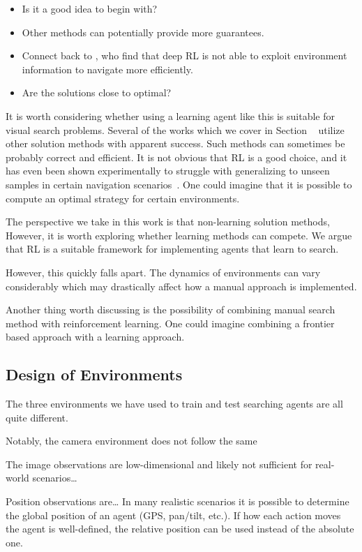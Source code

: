 \begin{itemize}
    \item Is it a good idea to begin with?
    \item Other methods can potentially provide more guarantees.
    \item Connect back to \cite{dhiman_critical_2019}, who find that deep RL is not able to exploit environment information to navigate more efficiently.
    \item Are the solutions close to optimal?
\end{itemize}

It is worth considering whether using a learning agent like this is suitable for visual search problems.
Several of the works which we cover in Section ~\label{sec:relatedwork} utilize other solution methods with apparent success.
Such methods can sometimes be probably correct and efficient.
It is not obvious that RL is a good choice, and it has even been shown experimentally to struggle with generalizing to unseen samples in certain navigation scenarios~\cite{dhiman_critical_2019}.
One could imagine that it is possible to compute an optimal strategy for certain environments.

The perspective we take in this work is that non-learning solution methods,
However, it is worth exploring whether learning methods can compete.
We argue that RL is a suitable framework for implementing agents that learn to search.

However, this quickly falls apart.
The dynamics of environments can vary considerably which may drastically affect how a manual approach is implemented.

Another thing worth discussing is the possibility of combining manual search method with reinforcement learning.
One could imagine combining a frontier based approach with a learning approach.


\subsection{Design of Environments}

The three environments we have used to train and test searching agents are all quite different.

Notably, the camera environment does not follow the same 

The image observations are low-dimensional and likely not sufficient for real-world scenarios\dots

Position observations are\dots
In many realistic scenarios it is possible to determine the global position of an agent (GPS, pan/tilt, etc.).
If how each action moves the agent is well-defined, the relative position can be used instead of the absolute one.

